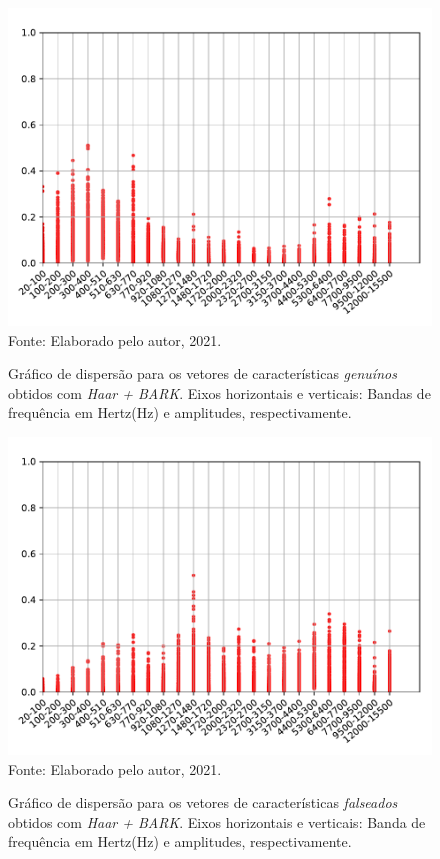 \begin{figure}[H]
	\centering
	\caption{Gráfico de dispersão para os vetores de características \textit{genuínos} obtidos com \textit{Haar + BARK}. Eixos horizontais e verticais: Bandas de frequência em Hertz(Hz) e amplitudes, respectivamente.}
	\includegraphics[scale=.8]{./images/results/barkVersusMel/Genuine_haar_Bark.pdf}
	\label{fig:livehaarbark}
	\\Fonte: Elaborado pelo autor, 2021.
\end{figure}
\begin{figure}[H]
	\centering
	\caption{Gráfico de dispersão para os vetores de características \textit{falseados} obtidos com \textit{Haar + BARK}. Eixos horizontais e verticais: Banda de frequência em Hertz(Hz) e amplitudes, respectivamente.}
	\includegraphics[scale=.8]{./images/results/barkVersusMel/Spoofing_haar_Bark.pdf}
	\label{fig:spoofinghaarbark}
	\\Fonte: Elaborado pelo autor, 2021.
\end{figure}
